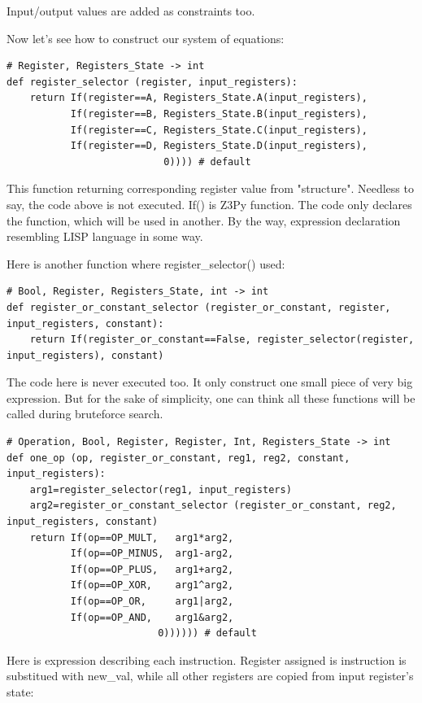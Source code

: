 Input/output values are added as constraints too.

Now let's see how to construct our system of equations:

\begin{lstlisting}
# Register, Registers_State -> int
def register_selector (register, input_registers):
    return If(register==A, Registers_State.A(input_registers),
           If(register==B, Registers_State.B(input_registers), 
           If(register==C, Registers_State.C(input_registers), 
           If(register==D, Registers_State.D(input_registers), 
                           0)))) # default
\end{lstlisting}

This function returning corresponding register value from "structure". 
Needless to say, the code above is not executed. 
If() is Z3Py function. 
The code only declares the function, which will be used in another. 
By the way, expression declaration resembling LISP language in some way.

Here is another function where register\_selector() used:

\begin{lstlisting}
# Bool, Register, Registers_State, int -> int
def register_or_constant_selector (register_or_constant, register, input_registers, constant): 
    return If(register_or_constant==False, register_selector(register, input_registers), constant)
\end{lstlisting}

The code here is never executed too. 
It only construct one small piece of very big expression. 
But for the sake of simplicity, one can think all these functions will be called during bruteforce search.

\begin{lstlisting}
# Operation, Bool, Register, Register, Int, Registers_State -> int
def one_op (op, register_or_constant, reg1, reg2, constant, input_registers):
    arg1=register_selector(reg1, input_registers)
    arg2=register_or_constant_selector (register_or_constant, reg2, input_registers, constant)
    return If(op==OP_MULT,   arg1*arg2,
           If(op==OP_MINUS,  arg1-arg2,
           If(op==OP_PLUS,   arg1+arg2, 
           If(op==OP_XOR,    arg1^arg2, 
           If(op==OP_OR,     arg1|arg2, 
           If(op==OP_AND,    arg1&arg2, 
                          0)))))) # default
\end{lstlisting}

Here is expression describing each instruction. 
Register assigned is instruction is substitued with new\_val, 
while all other registers are copied from input register's state:

